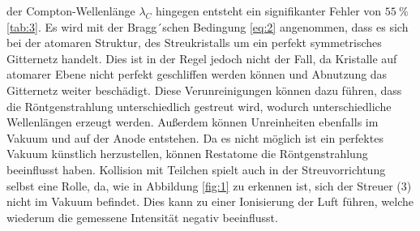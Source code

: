     \justifying der Compton-Wellenlänge $\lambda_C$ hingegen entsteht ein signifikanter Fehler von $\SI{55}{\percent}$ \ref{tab:3}. Es wird mit der Bragg´schen Bedingung \eqref{eq:2} 
    angenommen, dass es sich bei der atomaren Struktur, des Streukristalls um ein perfekt symmetrisches Gitternetz handelt. Dies ist in der Regel jedoch nicht der Fall, da Kristalle auf atomarer
    Ebene nicht perfekt geschliffen werden können und Abnutzung das Gitternetz weiter beschädigt. Diese Verunreinigungen können dazu führen, dass die Röntgenstrahlung unterschiedlich gestreut wird, 
    wodurch unterschiedliche Wellenlängen erzeugt werden. Außerdem können Unreinheiten ebenfalls im Vakuum und auf der Anode entstehen. Da es nicht möglich ist ein perfektes Vakuum künstlich herzustellen, 
    können Restatome die Röntgenstrahlung beeinflusst haben. Kollision mit Teilchen spielt auch in der Streuvorrichtung selbst eine Rolle, da, wie in Abbildung \ref{fig:1} zu erkennen ist, sich der 
    Streuer (3) nicht im Vakuum befindet. Dies kann zu einer Ionisierung der Luft führen, welche wiederum die gemessene Intensität negativ beeinflusst.  

\newpage
\printbibliography

